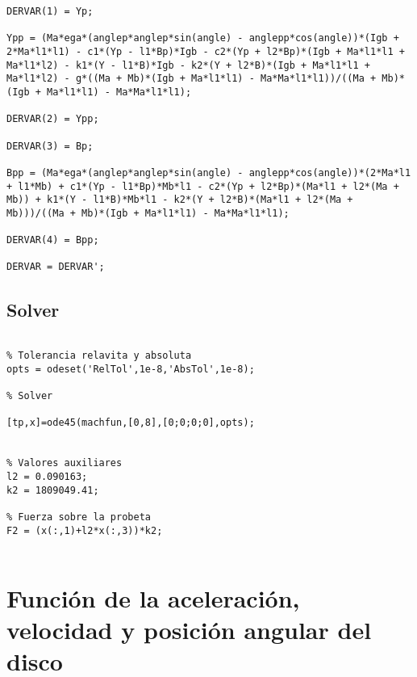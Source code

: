 \begin{lstlisting}
DERVAR(1) = Yp;

Ypp = (Ma*ega*(anglep*anglep*sin(angle) - anglepp*cos(angle))*(Igb + 2*Ma*l1*l1) - c1*(Yp - l1*Bp)*Igb - c2*(Yp + l2*Bp)*(Igb + Ma*l1*l1 + Ma*l1*l2) - k1*(Y - l1*B)*Igb - k2*(Y + l2*B)*(Igb + Ma*l1*l1 + Ma*l1*l2) - g*((Ma + Mb)*(Igb + Ma*l1*l1) - Ma*Ma*l1*l1))/((Ma + Mb)*(Igb + Ma*l1*l1) - Ma*Ma*l1*l1);

DERVAR(2) = Ypp;

DERVAR(3) = Bp;

Bpp = (Ma*ega*(anglep*anglep*sin(angle) - anglepp*cos(angle))*(2*Ma*l1 + l1*Mb) + c1*(Yp - l1*Bp)*Mb*l1 - c2*(Yp + l2*Bp)*(Ma*l1 + l2*(Ma + Mb)) + k1*(Y - l1*B)*Mb*l1 - k2*(Y + l2*B)*(Ma*l1 + l2*(Ma + Mb)))/((Ma + Mb)*(Igb + Ma*l1*l1) - Ma*Ma*l1*l1);

DERVAR(4) = Bpp;

DERVAR = DERVAR';

\end{lstlisting}


\subsection{Solver}
\label{sec:solver_part}

\begin{lstlisting}

% Tolerancia relavita y absoluta
opts = odeset('RelTol',1e-8,'AbsTol',1e-8);		

% Solver

[tp,x]=ode45(machfun,[0,8],[0;0;0;0],opts);


% Valores auxiliares
l2 = 0.090163;				
k2 = 1809049.41;			

% Fuerza sobre la probeta
F2 = (x(:,1)+l2*x(:,3))*k2;						


\end{lstlisting}

\section{Función de la aceleración, velocidad y posición angular del disco}
\label{sec:phi_fun}

